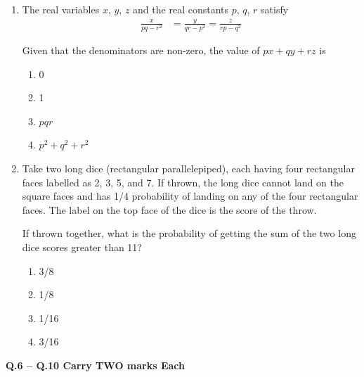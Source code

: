 \documentclass[journal,11pt,onecolumn]{IEEEtran}
\begin{document}
\begin{enumerate}
    \item The real variables $x$, $y$, $z$ and the real constants $p$, $q$, $r$ satisfy
          \begin{align}
              \frac{x}{pq-r^2} & = \frac{y}{qr-p^2} = \frac{z}{rp-q^2}
          \end{align}

          Given that the denominators are non-zero, the value of $px + qy + rz$ is

          \begin{enumerate}
              \item 0
              \item 1
              \item $pqr$
              \item $p^2 + q^2 + r^2$
          \end{enumerate}

    \item Take two long dice (rectangular parallelepiped), each having four rectangular faces labelled as 2, 3, 5, and 7. If thrown, the long dice cannot land on the square faces and has 1/4 probability of landing on any of the four rectangular faces. The label on the top face of the dice is the score of the throw.

          If thrown together, what is the probability of getting the sum of the two long dice scores greater than 11?

          \begin{enumerate}
              \item 3/8
              \item 1/8
              \item 1/16
              \item 3/16
          \end{enumerate}

\end{enumerate}

\large\textbf{Q.6 – Q.10 Carry TWO marks Each}\\
\end{document}

